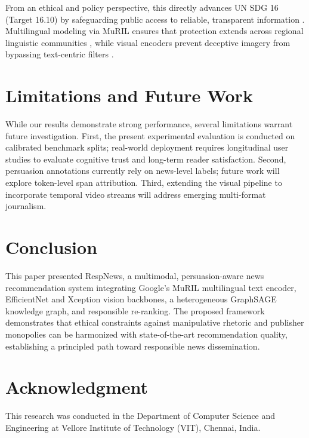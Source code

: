 \documentclass[conference]{IEEEtran}
\begin{document}
From an ethical and policy perspective, this directly advances UN SDG 16 (Target 16.10) by safeguarding public access to reliable, transparent information \cite{sdg}. Multilingual modeling via MuRIL ensures that protection extends across regional linguistic communities \cite{khanuja_muril}, while visual encoders prevent deceptive imagery from bypassing text-centric filters \cite{dimitrov_semeval2021}.

\section{Limitations and Future Work}
While our results demonstrate strong performance, several limitations warrant future investigation. First, the present experimental evaluation is conducted on calibrated benchmark splits; real-world deployment requires longitudinal user studies to evaluate cognitive trust and long-term reader satisfaction. Second, persuasion annotations currently rely on news-level labels; future work will explore token-level span attribution. Third, extending the visual pipeline to incorporate temporal video streams will address emerging multi-format journalism.

\section{Conclusion}
This paper presented RespNews, a multimodal, persuasion-aware news recommendation system integrating Google's MuRIL multilingual text encoder, EfficientNet and Xception vision backbones, a heterogeneous GraphSAGE knowledge graph, and responsible re-ranking. The proposed framework demonstrates that ethical constraints against manipulative rhetoric and publisher monopolies can be harmonized with state-of-the-art recommendation quality, establishing a principled path toward responsible news dissemination.

\section*{Acknowledgment}
This research was conducted in the Department of Computer Science and Engineering at Vellore Institute of Technology (VIT), Chennai, India.
\end{document}
